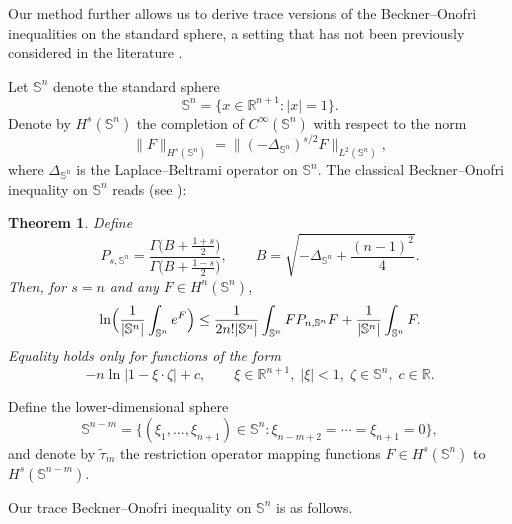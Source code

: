 \documentclass[12pt,reqno]{amsart}%
\newtheorem{theorem}{Theorem}[section]
\theoremstyle{plain}
\numberwithin{equation}{section}
\begin{document}
Our method further allows us to derive trace versions of the Beckner--Onofri inequalities on the standard sphere, a setting that has not been previously considered in the literature \cite{ei,be2,bez}.

Let \(\mathbb{S}^{n}\) denote the standard sphere
\[
\mathbb{S}^{n} = \{ x \in \mathbb{R}^{n+1} : |x| = 1 \}.
\]
Denote by \(H^{s}(\mathbb{S}^{n})\) the completion of \(C^\infty(\mathbb{S}^{n})\) with respect to the norm
\[
\| F \|_{H^{s}(\mathbb{S}^{n})} = \| (-\Delta_{\mathbb{S}^{n}})^{s/2} F \|_{L^{2}(\mathbb{S}^{n})},
\]
where \(\Delta_{\mathbb{S}^{n}}\) is the Laplace--Beltrami operator on \(\mathbb{S}^{n}\).
The classical Beckner--Onofri inequality on \(\mathbb{S}^{n}\) reads (see \cite{on,be1}):

\begin{theorem}  \label{Beckner}
Define
\begin{equation*}
P_{s,\mathbb{S}^{n}} = \frac{\Gamma\bigl(B + \frac{1+s}{2} \bigr)}{\Gamma\bigl(B + \frac{1-s}{2} \bigr)}, \qquad
B = \sqrt{-\Delta_{\mathbb{S}^{n}} + \frac{(n-1)^{2}}{4}} .
\end{equation*}
Then, for \( s = n \) and any \( F \in H^{n}(\mathbb{S}^{n}) \),
\begin{equation}\label{1.9}
\ln\Bigl( \frac{1}{|\mathbb{S}^{n}|} \int_{\mathbb{S}^{n}} e^{F} \Bigr) \leq
\frac{1}{2n!|\mathbb{S}^{n}|} \int_{\mathbb{S}^{n}} F  P_{n,\mathbb{S}^{n}} F
+ \frac{1}{|\mathbb{S}^{n}|} \int_{\mathbb{S}^{n}} F .
\end{equation}
Equality holds only for functions of the form
\[
- n \ln| 1 -  \xi \cdot \zeta | + c, \qquad
\xi \in \mathbb{R}^{n+1},\;|\xi|<1,\;  \zeta \in \mathbb{S}^{n},\; c \in \mathbb{R}.
\]
\end{theorem}

Define the lower-dimensional sphere
\[
\mathbb{S}^{n-m} = \bigl\{ (\xi_{1},\dots, \xi_{n+1}) \in \mathbb{S}^{n} : \xi_{n-m+2} = \cdots = \xi_{n+1} = 0 \bigr\},
\]
and denote by \(\widetilde{\tau}_{m}\) the restriction operator mapping functions \(F \in H^{s}(\mathbb{S}^{n})\) to \(H^{s}(\mathbb{S}^{n-m})\).

Our trace  Beckner--Onofri inequality on \(\mathbb{S}^{n}\) is as follows.
\end{document}
